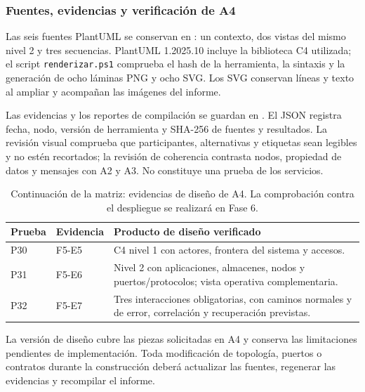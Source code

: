 \subsubsection{Fuentes, evidencias y verificación de A4}

Las seis fuentes PlantUML se conservan en
: un contexto, dos vistas del mismo nivel 2 y
tres secuencias. PlantUML 1.2025.10 incluye la biblioteca C4 utilizada;
el script \texttt{renderizar.ps1} comprueba el hash de la herramienta,
la sintaxis y la generación de ocho láminas PNG y ocho SVG. Los SVG conservan
líneas y texto al ampliar y acompañan las imágenes del informe.

Las evidencias y los reportes de compilación se guardan en
. El JSON registra fecha, nodo, versión
de herramienta y SHA-256 de fuentes y resultados. La revisión visual
comprueba que participantes, alternativas y etiquetas sean legibles y no
estén recortados; la revisión de coherencia contrasta nodos, propiedad de
datos y mensajes con A2 y A3. No constituye una prueba de los servicios.

\begin{table}[H]
\centering\small
\begin{tabularx}{\textwidth}{>{\raggedright\arraybackslash}p{1.3cm} >{\raggedright\arraybackslash}p{1.9cm} X}
\toprule
\textbf{Prueba} & \textbf{Evidencia} & \textbf{Producto de diseño verificado} \\
\midrule
P30 & F5-E5 & C4 nivel 1 con actores, frontera del sistema y accesos. \\
P31 & F5-E6 & Nivel 2 con aplicaciones, almacenes, nodos y puertos/protocolos; vista operativa complementaria. \\
P32 & F5-E7 & Tres interacciones obligatorias, con caminos normales y de error, correlación y recuperación previstas. \\
\bottomrule
\end{tabularx}
\caption{Continuación de la matriz: evidencias de diseño de A4. La comprobación contra el despliegue se realizará en Fase 6.}
\label{tab:a4-evidencias}
\end{table}

La versión de diseño cubre las piezas solicitadas en A4 y conserva las
limitaciones pendientes de implementación. Toda modificación de topología,
puertos o contratos durante la construcción deberá actualizar las fuentes,
regenerar las evidencias y recompilar el informe.
